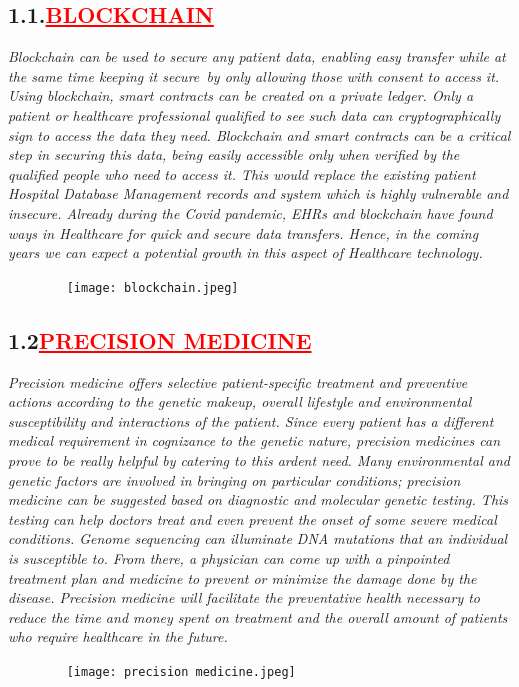 \documentclass[12pt]{article}
\begin{document}
\subsection*{\textbf{\hspace{1cm}1.1.\hspace{1cm}\textcolor{red}{\underline{\huge{BLOCKCHAIN}}}}}
\hspace{1cm}\large{\emph{Blockchain can be used to secure any patient data, enabling easy transfer while at the same time keeping it secure by only allowing those with consent to access it.}}\vspace{1cm}\newline
\hspace{1cm}\large{\emph{Using blockchain, smart contracts can be created on a private ledger. Only a patient or healthcare professional qualified to see such data can cryptographically sign to access the data they need. Blockchain and smart contracts can be a critical step in securing this data, being easily accessible only when verified by the qualified people who need to access it. This would replace the existing patient Hospital Database Management records and system which is highly vulnerable and insecure. Already during the Covid pandemic, EHRs and blockchain have found ways in Healthcare for quick and secure data transfers. Hence, in the coming years we can expect a potential growth in this aspect of Healthcare technology.}}
\begin{figure}
    \centering
    \texttt{[image: blockchain.jpeg]}
\end{figure}
\newpage
\subsection*{\textbf{\hspace{1cm}1.2\hspace{1cm}\textcolor{red}{\underline{\huge{PRECISION MEDICINE}}}}}
\hspace{1cm}\large{\emph{Precision medicine offers selective patient-specific treatment and preventive actions according to the genetic makeup, overall lifestyle and environmental susceptibility and interactions of the patient. Since every patient has a different medical requirement in cognizance to the genetic nature, precision medicines can prove to be really helpful by catering to this ardent need. Many environmental and genetic factors are involved in bringing on particular conditions; precision medicine can be suggested based on diagnostic and molecular genetic testing. This testing can help doctors treat and even prevent the onset of some severe medical conditions. Genome sequencing can illuminate DNA mutations that an individual is susceptible to. From there, a physician can come up with a pinpointed treatment plan and medicine to prevent or minimize the damage done by the disease. Precision medicine will facilitate the preventative health necessary to reduce the time and money spent on treatment and the overall amount of patients who require healthcare in the future.}}
\begin{figure}
    \centering
    \texttt{[image: precision medicine.jpeg]}
\end{figure}
\newpage
\end{document}
